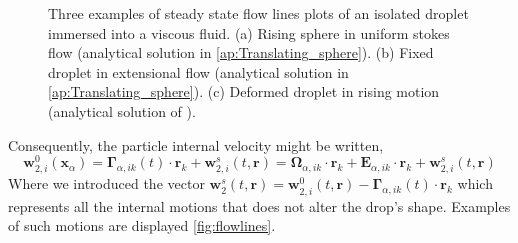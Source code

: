 \begin{figure}
    \centering
    \caption{Three examples of steady state flow lines plots of an isolated droplet immersed into a viscous fluid. 
    (a) Rising sphere in uniform stokes flow (analytical solution in \ref{ap:Translating_sphere}). 
    (b) Fixed droplet in extensional flow (analytical solution in \ref{ap:Translating_sphere}).
    (c) Deformed droplet in rising motion (analytical solution of \citet{taylor1964deformation}). }
\end{figure}
Consequently, the particle internal velocity might be written, 
\begin{equation}
    \textbf{w}_{2,i}^0(\textbf{x}_\alpha)
    = \bm\Gamma_{\alpha,ik}(t) \cdot \textbf{r}_k
    + \textbf{w}^{s}_{2,i}(t,\textbf{r})
    =\bm{\Omega}_{\alpha,ik}\cdot \textbf{r}_k
    + \textbf{E}_{\alpha,ik} \cdot \textbf{r}_k
    + \textbf{w}^{s}_{2,i}(t,\textbf{r})
\end{equation}
Where we introduced the vector $\textbf{w}^{s}_2(t,\textbf{r}) =\textbf{w}^{0}_{2,i}(t,\textbf{r})  - \bm\Gamma_{\alpha,ik}(t) \cdot \textbf{r}_k$ which represents all the internal motions that does not alter the drop's shape. 
Examples of such motions are displayed \ref{fig:flowlines}. 



